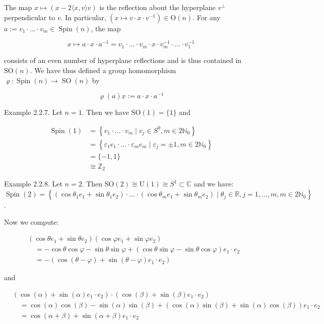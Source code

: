 \documentclass[10pt, letterpaper]{article}
\begin{document}
The map $x \mapsto(x-2\langle x, v\rangle v)$ is the reflection about the hyperplane $v^{\perp}$ perpendicular to $v$. In particular, $\left(x \mapsto v \cdot x \cdot v^{-1}\right) \in \mathrm{O}(n)$. For any $a:=v_{1} \cdot \ldots \cdot v_{m} \in \operatorname{Spin}(n)$, the map

$$
x \mapsto a \cdot x \cdot a^{-1}=v_{1} \cdot \ldots \cdot v_{m} \cdot x \cdot v_{m}^{-1} \cdot \ldots \cdot v_{1}^{-1}
$$

consists of an even number of hyperplane reflections and is thus contained in $\mathrm{SO}(n)$. We have thus defined a group homomorphism $\varrho: \operatorname{Spin}(n) \rightarrow \operatorname{SO}(n)$ by

$$
\varrho(a) x:=a \cdot x \cdot a^{-1}
$$

Example 2.2.7. Let $n=1$. Then we have $\mathrm{SO}(1)=\{1\}$ and

$$
\begin{aligned}
\operatorname{Spin}(1) & =\left\{v_{1} \cdot \ldots \cdot v_{m} \mid v_{j} \in S^{0}, m \in 2 \mathbb{N}_{0}\right\} \\
& =\left\{\varepsilon_{1} e_{1} \cdot \ldots \cdot \varepsilon_{m} e_{m} \mid \varepsilon_{j}= \pm 1, m \in 2 \mathbb{N}_{0}\right\} \\
& =\{-1,1\} \\
& \cong \mathbb{Z}_{2}
\end{aligned}
$$

Example 2.2.8. Let $n=2$. Then $\mathrm{SO}(2) \cong \mathrm{U}(1) \cong S^{1} \subset \mathbb{C}$ and we have:\\
$\operatorname{Spin}(2)=\left\{\left(\cos \theta_{1} e_{1}+\sin \theta_{1} e_{2}\right) \cdot \ldots \cdot\left(\cos \theta_{m} e_{1}+\sin \theta_{m} e_{2}\right) \mid \theta_{j} \in \mathbb{R}, j=1, \ldots, m, m \in 2 \mathbb{N}_{0}\right\}$.

Now we compute:

$$
\begin{aligned}
& \left(\cos \theta e_{1}+\sin \theta e_{2}\right)\left(\cos \varphi e_{1}+\sin \varphi e_{2}\right) \\
& \quad=-\cos \theta \cos \varphi-\sin \theta \sin \varphi+(\cos \theta \sin \varphi-\sin \theta \cos \varphi) e_{1} \cdot e_{2} \\
& \quad=-\left(\cos (\theta-\varphi)+\sin (\theta-\varphi) e_{1} \cdot e_{2}\right)
\end{aligned}
$$

and

$$
\begin{aligned}
& \left(\cos (\alpha)+\sin (\alpha) e_{1} \cdot e_{2}\right) \cdot\left(\cos (\beta)+\sin (\beta) e_{1} \cdot e_{2}\right) \\
& \quad=\cos (\alpha) \cos (\beta)-\sin (\alpha) \sin (\beta)+(\cos (\alpha) \sin (\beta)+\sin (\alpha) \cos (\beta)) e_{1} \cdot e_{2} \\
& \quad=\cos (\alpha+\beta)+\sin (\alpha+\beta) e_{1} \cdot e_{2}
\end{aligned}
$$
\end{document}
